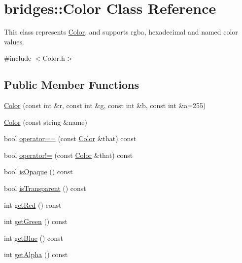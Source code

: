 \hypertarget{classbridges_1_1_color}{}\section{bridges\+:\+:Color Class Reference}
\label{classbridges_1_1_color}


This class represents \mbox{\hyperlink{classbridges_1_1_color}{Color}}, and supports rgba, hexadecimal and named color values.  




{\ttfamily \#include $<$Color.\+h$>$}

\subsection*{Public Member Functions}
\begin{DoxyCompactItemize}
\item 
\mbox{\hyperlink{classbridges_1_1_color_aa861c0dc7729008cc4f886f235198181}{Color}} (const int \&r, const int \&g, const int \&b, const int \&a=255)
\item 
\mbox{\hyperlink{classbridges_1_1_color_a813c6cb59aad0883bcc12305fa6049cc}{Color}} (const string \&name)
\item 
bool \mbox{\hyperlink{classbridges_1_1_color_a9b33b4ee063496691f8816504cc8b007}{operator==}} (const \mbox{\hyperlink{classbridges_1_1_color}{Color}} \&that) const
\item 
bool \mbox{\hyperlink{classbridges_1_1_color_abe4ff1e5d4c6a33b2e9715be57ae0dce}{operator!=}} (const \mbox{\hyperlink{classbridges_1_1_color}{Color}} \&that) const
\item 
bool \mbox{\hyperlink{classbridges_1_1_color_ae55f3077cb3bd93386dc11eaeecf823c}{is\+Opaque}} () const
\item 
bool \mbox{\hyperlink{classbridges_1_1_color_a56b0d17239aafa0cea7f43e5358cf4c0}{is\+Transparent}} () const
\item 
int \mbox{\hyperlink{classbridges_1_1_color_a4c81e33854a6fdba9a3030e97ec8609e}{get\+Red}} () const
\item 
int \mbox{\hyperlink{classbridges_1_1_color_a93f8e016e1f1e6c177924ad8712e3e48}{get\+Green}} () const
\item 
int \mbox{\hyperlink{classbridges_1_1_color_aa7a70279f41f2cceb640162c43a2a382}{get\+Blue}} () const
\item 
int \mbox{\hyperlink{classbridges_1_1_color_a61523716f5597013d57bc98eae1fe96a}{get\+Alpha}} () const
\item 

\end{DoxyCompactItemize}

